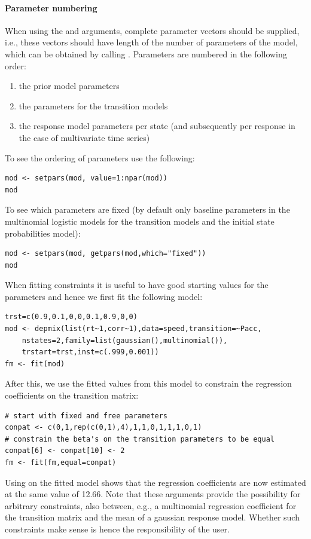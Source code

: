 \documentclass[article]{jss}
\begin{document}
\paragraph{Parameter numbering} When using the  and
 arguments, complete parameter vectors should be supplied,
i.e., these vectors should have length of the number of parameters of
the model, which can be obtained by calling .
Parameters are numbered in the following order:
\begin{enumerate}
	\item  the prior model parameters
	\item  the parameters for the transition models
	\item  the response model parameters per state (and subsequently
	per response in the case of multivariate time series)
\end{enumerate}

To see the ordering of parameters use the following:
\begin{verbatim}
mod <- setpars(mod, value=1:npar(mod))
mod
\end{verbatim}

To see which parameters are fixed (by default only baseline parameters
in the multinomial logistic models for the transition models and the
initial state probabilities model):
\begin{verbatim}
mod <- setpars(mod, getpars(mod,which="fixed"))
mod
\end{verbatim}

When fitting constraints it is useful to have good starting values 
for the parameters and hence we first fit the following model: 
\begin{verbatim}
trst=c(0.9,0.1,0,0,0.1,0.9,0,0)
mod <- depmix(list(rt~1,corr~1),data=speed,transition=~Pacc,
	nstates=2,family=list(gaussian(),multinomial()),
	trstart=trst,inst=c(.999,0.001))
fm <- fit(mod)
\end{verbatim}
After this, we use the fitted values from this model to constrain the 
regression coefficients on the transition matrix:
\begin{verbatim}
# start with fixed and free parameters
conpat <- c(0,1,rep(c(0,1),4),1,1,0,1,1,1,0,1)
# constrain the beta's on the transition parameters to be equal
conpat[6] <- conpat[10] <- 2
fm <- fit(fm,equal=conpat)
\end{verbatim}
Using  on the fitted model shows that the regression 
coefficients are now estimated at the same value of 12.66. 
Note that these arguments provide the possibility for arbitrary 
constraints, also between, e.g., a multinomial regression coefficient 
for the transition matrix and the mean of a gaussian response model. 
Whether such constraints make sense is hence the responsibility of 
the user. 
\end{document}
